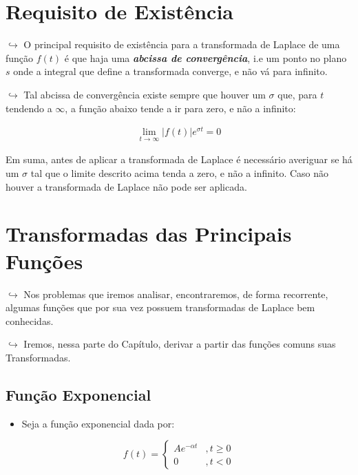 \documentclass{article}
\begin{document}
\begin{itemize}
\hypertarget{requisito-de-existuxeancia}{%
\section{Requisito de Existência}\label{requisito-de-existuxeancia}}

\(\hookrightarrow\) O principal requisito de existência para a
transformada de Laplace de uma função \(f(t)\) é que haja uma
\textbf{\emph{abcissa de convergência}}, i.e um ponto no plano \(s\)
onde a integral que define a transformada converge, e não vá para
infinito.

\(\hookrightarrow\) Tal abcissa de convergência existe sempre que houver
um \(\sigma\) que, para \(t\) tendendo a \(\infty\), a função abaixo
tende a ir para zero, e não a infinito:

\[
\begin{align}
\lim_{t\rightarrow \infty}|f(t)|e^{\sigma t} = 0
\end{align}
\]

Em suma, antes de aplicar a transformada de Laplace é necessário
averiguar se há um \(\sigma\) tal que o limite descrito acima tenda a
zero, e não a infinito. Caso não houver a transformada de Laplace não
pode ser aplicada.

\hypertarget{transformadas-das-principais-funuxe7uxf5es}{%
\section{Transformadas das Principais
Funções}\label{transformadas-das-principais-funuxe7uxf5es}}

\(\hookrightarrow\) Nos problemas que iremos analisar, encontraremos, de
forma recorrente, algumas funções que por sua vez possuem transformadas
de Laplace bem conhecidas.

\(\hookrightarrow\) Iremos, nessa parte do Capítulo, derivar a partir
das funções comuns suas Transformadas.

\hypertarget{funuxe7uxe3o-exponencial}{%
\subsection{Função Exponencial}\label{funuxe7uxe3o-exponencial}}

\begin{itemize}
\tightlist
\item
  Seja a função exponencial dada por:
\end{itemize}

\[
f(t) = \begin{cases}
Ae^{-\alpha t} & , t\ge0 \\ 
0 & , t<0
\end{cases}
\]


\end{itemize}
\end{document}

